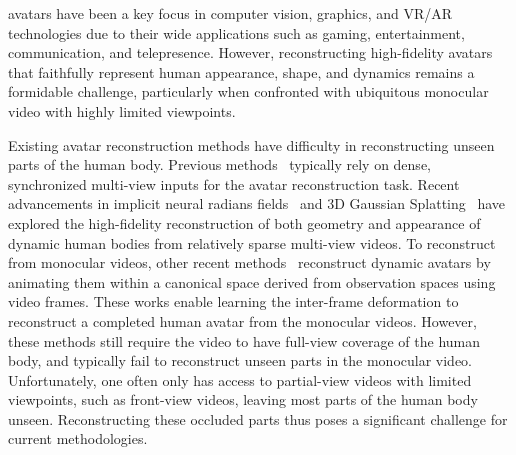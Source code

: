 
 avatars have been a key focus in computer vision, graphics, and VR/AR technologies due to their wide applications such as gaming, entertainment, communication, and telepresence. However, reconstructing high-fidelity avatars that faithfully represent human appearance, shape, and dynamics remains a formidable challenge, particularly when confronted with ubiquitous monocular video with highly limited viewpoints.

Existing avatar reconstruction methods have difficulty in reconstructing unseen parts of the human body.
Previous methods~\cite{peng2021neural,peng2024animatable,su2022danbo,wang2022arah} typically rely on dense, synchronized multi-view inputs for the avatar reconstruction task. Recent advancements in implicit neural radians fields~\cite{mildenhall2021nerf,peng2021neural,su2022danbo,wang2022arah} and 3D Gaussian Splatting~\cite{kerbl3Dgaussians,lei2023gart,yin2023humanrecon,zheng2023gps} have explored the high-fidelity reconstruction of both geometry and appearance of dynamic human bodies from relatively sparse multi-view videos. %
To reconstruct from monocular videos, other recent methods~\cite{weng2022humannerf,su2021nerf,su2023npc,yu2023monohuman,huang2023efficient,instant_nvr,hu2023gaussianavatar} reconstruct dynamic avatars by animating them within a canonical space derived from observation spaces using video frames. These works enable learning the inter-frame deformation to reconstruct a completed human avatar from the monocular videos. However, these methods still require the video to %
have full-view coverage of the human body, and typically fail to reconstruct unseen parts in the monocular video. Unfortunately, one often only has access to partial-view videos with limited viewpoints, such as front-view videos, leaving most parts of the human body unseen. Reconstructing these occluded parts thus poses a significant challenge for current methodologies.







